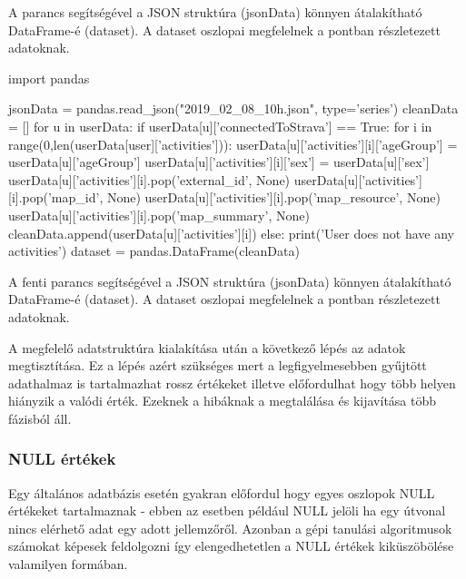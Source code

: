 \begin{programreszlet}
A  parancs segítségével a JSON struktúra (jsonData) könnyen átalakítható DataFrame-é (dataset). A dataset oszlopai megfelelnek a  pontban részletezett adatoknak.
\begin{python}
import pandas

jsonData = pandas.read_json("2019_02_08_10h.json", type='series')
cleanData = []
for u in userData:
  if userData[u]['connectedToStrava'] == True:
    for i in range(0,len(userData[user]['activities'])):
       userData[u]['activities'][i]['ageGroup'] = userData[u]['ageGroup']
       userData[u]['activities'][i]['sex'] = userData[u]['sex']
       userData[u]['activities'][i].pop('external_id', None)
       userData[u]['activities'][i].pop('map_id', None)
       userData[u]['activities'][i].pop('map_resource', None)
       userData[u]['activities'][i].pop('map_summary', None)
       cleanData.append(userData[u]['activities'][i]) 
  else:
    print('User does not have any activities')
dataset = pandas.DataFrame(cleanData)

\end{python}
\end{programreszlet}


A fenti parancs segítségével a JSON struktúra (jsonData) könnyen átalakítható DataFrame-é (dataset). A dataset oszlopai megfelelnek a  pontban részletezett adatoknak.


A megfelelő adatstruktúra kialakítása után a következő lépés az adatok megtisztítása. Ez a lépés azért szükséges mert a legfigyelmesebben gyűjtött adathalmaz is tartalmazhat rossz értékeket illetve előfordulhat hogy több helyen hiányzik a valódi érték. Ezeknek a hibáknak a megtalálása és kijavítása több fázisból áll.

\subsubsection{NULL értékek}
Egy általános adatbázis esetén gyakran előfordul hogy egyes oszlopok NULL értékeket tartalmaznak - ebben az esetben például NULL jelöli ha egy útvonal nincs elérhető adat egy adott jellemzőről. Azonban a gépi tanulási algoritmusok számokat képesek feldolgozni így elengedhetetlen a NULL értékek kiküszöbölése valamilyen formában.

